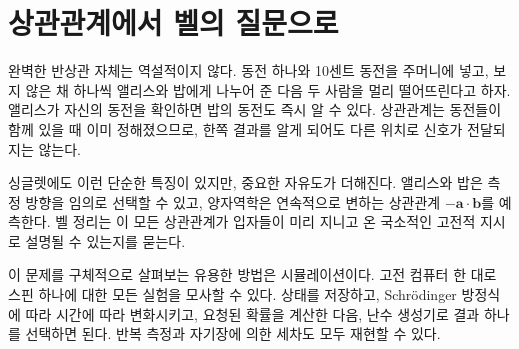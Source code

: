 \begin{classroomqa}
\end{classroomqa}

\section{상관관계에서 벨의 질문으로}

완벽한 반상관 자체는 역설적이지 않다. 동전 하나와 10센트 동전을 주머니에 넣고, 보지 않은 채 하나씩 앨리스와 밥에게 나누어 준 다음 두 사람을 멀리 떨어뜨린다고 하자. 앨리스가 자신의 동전을 확인하면 밥의 동전도 즉시 알 수 있다. 상관관계는 동전들이 함께 있을 때 이미 정해졌으므로, 한쪽 결과를 알게 되어도 다른 위치로 신호가 전달되지는 않는다.

싱글렛에도 이런 단순한 특징이 있지만, 중요한 자유도가 더해진다. 앨리스와 밥은 측정 방향을 임의로 선택할 수 있고, 양자역학은 연속적으로 변하는 상관관계 \(-\bm a\cdot\bm b\)를 예측한다. 벨 정리는 이 모든 상관관계가 입자들이 미리 지니고 온 국소적인 고전적 지시로 설명될 수 있는지를 묻는다.

\begin{classroomqa}
\end{classroomqa}

\begin{classroomqa}
\end{classroomqa}

이 문제를 구체적으로 살펴보는 유용한 방법은 시뮬레이션이다. 고전 컴퓨터 한 대로 스핀 하나에 대한 모든 실험을 모사할 수 있다. 상태를 저장하고, Schr\"odinger 방정식에 따라 시간에 따라 변화시키고, 요청된 확률을 계산한 다음, 난수 생성기로 결과 하나를 선택하면 된다. 반복 측정과 자기장에 의한 세차도 모두 재현할 수 있다.

